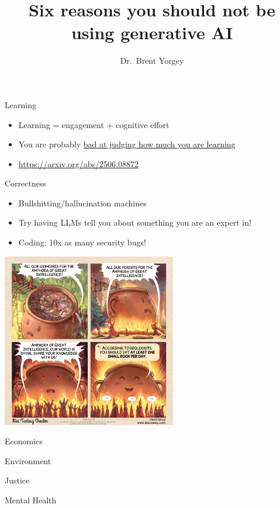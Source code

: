 \documentclass[xcolor={usenames,dvipsnames,svgnames,table},12pt]{beamer}
\title{Six reasons you should not be using generative AI}
\date{}
\author{Dr.\ Brent Yorgey}
\begin{document}
\maketitle

\begin{frame}{Learning}
  \begin{itemize}
  \item Learning = engagement + cognitive effort
  \item You are probably \href{https://www.pnas.org/doi/10.1073/pnas.1821936116}{bad at judging how much you are learning}
  \item \url{https://arxiv.org/abs/2506.08872}
  \end{itemize}
\end{frame}

\begin{frame}{Correctness}
  \begin{itemize}
  \item Bullshitting/hallucination machines
  \item Try having LLMs tell you about something you are an expert in!
  \item Coding: 10x as many security bugs!
  \end{itemize}
\end{frame}

\begin{frame}
  \begin{center}
    \includegraphics[width=3in]{AGI}
  \end{center}
\end{frame}

\begin{frame}{Economics}
\end{frame}

\begin{frame}{Environment}
\end{frame}

\begin{frame}{Justice}
\end{frame}

\begin{frame}{Mental Health}
\end{frame}
\end{document}
